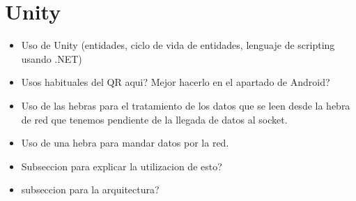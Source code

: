 \section{Unity}

\begin {itemize}
\item Uso de Unity (entidades, ciclo de vida de entidades, lenguaje de scripting usando .NET)
\item Usos habituales del QR aqui? Mejor hacerlo en el apartado de Android?
\item Uso de las hebras para el tratamiento de los datos que se leen desde la hebra de red que tenemos pendiente de la llegada de datos al socket.
\item Uso de una hebra para mandar datos por la red.
\item Subseccion para explicar la utilizacion de esto?
\item subseccion para la arquitectura?
\end {itemize}


